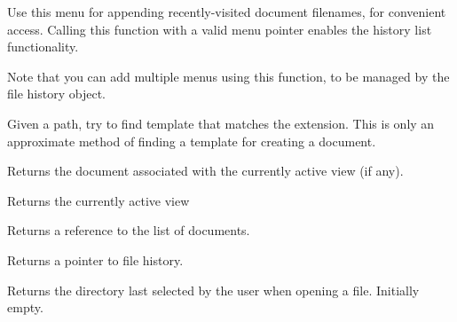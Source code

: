 


\label{wxdocmanagerfilehistoryusemenu}


Use this menu for appending recently-visited document filenames, for convenient
access. Calling this function with a valid menu pointer enables the history
list functionality.

Note that you can add multiple menus using this function, to be managed by the
file history object.


\label{wxdocmanagerfindtemplateforpath}


Given a path, try to find template that matches the extension. This is only
an approximate method of finding a template for creating a document.


\label{wxdocmanagergetcurrentdocument}


Returns the document associated with the currently active view (if any).


\label{wxdocmanagergetcurrentview}


Returns the currently active view 


\label{wxdocmanagergetdocuments}


Returns a reference to the list of documents.


\label{wxdocmanagergetfilehistory}


Returns a pointer to file history.


\label{wxdocmanagergetlastdirectory}


Returns the directory last selected by the user when opening a file. Initially empty.



